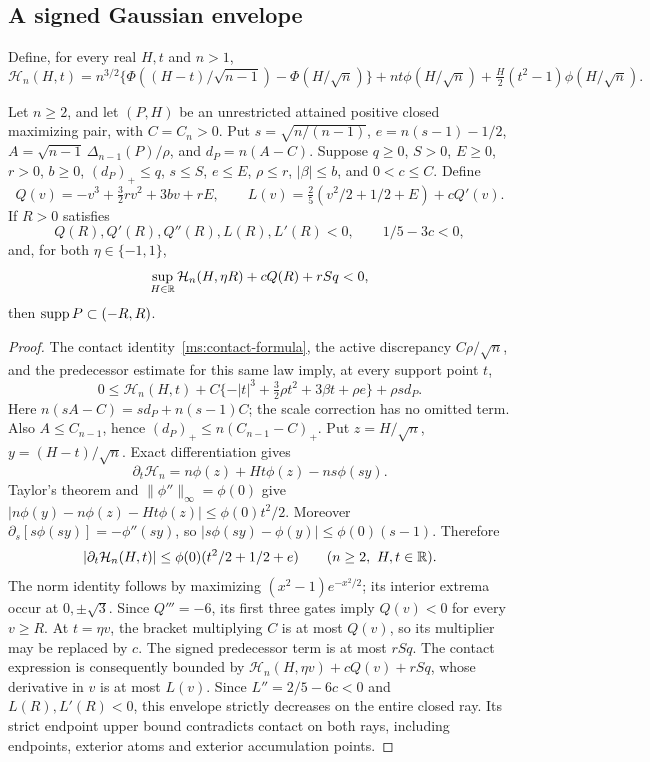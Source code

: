 \subsection{A signed Gaussian envelope}
Define, for every real $H,t$ and $n>1$,
\[
 \mathcal H_n(H,t)=n^{3/2}\{\Phi((H-t)/\sqrt{n-1})-
             \Phi(H/\sqrt n)\}
       +nt\phi(H/\sqrt n)+\tfrac H2(t^2-1)\phi(H/\sqrt n).
\]
\begin{lemma}\label{ms:legacy-support:direct}
Let \(n\ge2\), and let \((P,H)\) be an unrestricted attained
positive closed maximizing pair, with \(C=C_n>0\).
Put \(s=\sqrt{n/(n-1)}\), \(e=n(s-1)-1/2\),
\(A=\sqrt{n-1}\,\Delta_{n-1}(P)/\rho\), and \(d_P=n(A-C)\).
Suppose \(q\ge0\), \(S>0\), \(E\ge0\), \(r>0\), \(b\ge0\),
\((d_P)_+\le q\), \(s\le S\), \(e\le E\),
\(\rho\le r\), \(|\beta|\le b\), and \(0<c\le C\).
Define
\[
 Q(v)=-v^3+\tfrac32rv^2+3bv+rE,\qquad
 L(v)=\tfrac25(v^2/2+1/2+E)+cQ'(v).
\]
If \(R>0\) satisfies
\[
 Q(R),Q'(R),Q''(R),L(R),L'(R)<0,\qquad 1/5-3c<0,
\]
and, for both \(\eta\in\{-1,1\}\),
\[
 \sup_{H\in\mathbb R}\mathcal H_n(H,\eta R)+cQ(R)+rSq<0,
\]
then \(\operatorname{supp} P\subset(-R,R)\).
\end{lemma}
\begin{proof}
The contact identity~\eqref{ms:contact-formula}, the active
discrepancy \(C\rho/\sqrt n\), and the predecessor estimate
for this same law imply, at every support point \(t\),
\[
 0\le\mathcal H_n(H,t)
 +C\{-|t|^3+\tfrac32\rho t^2+3\beta t+\rho e\}
 +\rho s d_P.
\]
Here \(n(sA-C)=s d_P+n(s-1)C\); the scale correction has
no omitted term. Also \(A\le C_{n-1}\), hence
\((d_P)_+\le n(C_{n-1}-C)_+\).
Put \(z=H/\sqrt n\), \(y=(H-t)/\sqrt n\).
Exact differentiation gives
\[
 \partial_t\mathcal H_n=n\phi(z)+Ht\phi(z)-ns\phi(sy).
\]
Taylor's theorem and \(\|\phi''\|_\infty=\phi(0)\) give
\( |n\phi(y)-n\phi(z)-Ht\phi(z)|\le\phi(0)t^2/2\).
Moreover \(\partial_s[s\phi(sy)]=-\phi''(sy)\), so
\(|s\phi(sy)-\phi(y)|\le\phi(0)(s-1)\). Therefore
\[
 |\partial_t\mathcal H_n(H,t)|
 \le\phi(0)(t^2/2+1/2+e)
 \qquad(n\ge2,\ H,t\in\mathbb R).
\]
The norm identity follows by maximizing
\((x^2-1)e^{-x^2/2}\); its interior extrema occur at
\(0,\pm\sqrt3\).
Since \(Q'''=-6\), its first three gates imply \(Q(v)<0\)
for every \(v\ge R\). At \(t=\eta v\), the bracket multiplying
\(C\) is at most \(Q(v)\), so its multiplier may be replaced
by \(c\). The signed predecessor term is at most \(rSq\).
The contact expression is consequently bounded by
\(\mathcal H_n(H,\eta v)+cQ(v)+rSq\), whose derivative
in \(v\) is at most \(L(v)\). Since
\(L''=2/5-6c<0\) and \(L(R),L'(R)<0\), this envelope strictly
decreases on the entire closed ray. Its strict endpoint upper
bound contradicts contact on both rays, including endpoints,
exterior atoms and exterior accumulation points.
\end{proof}

